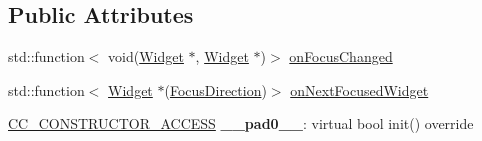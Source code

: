 \subsection*{Public Attributes}
\begin{DoxyCompactItemize}
\item 
std\+::function$<$ void(\hyperlink{classui_1_1Widget}{Widget} $\ast$, \hyperlink{classui_1_1Widget}{Widget} $\ast$)$>$ \hyperlink{classui_1_1Widget_a3e2ceb053bc91747ea2f175cd77e784b}{on\+Focus\+Changed}
\item 
std\+::function$<$ \hyperlink{classui_1_1Widget}{Widget} $\ast$(\hyperlink{classui_1_1Widget_a8ae8e8fc793a04a87584205cd1e8a8a5}{Focus\+Direction})$>$ \hyperlink{classui_1_1Widget_ac298bf6d67ef13843b798acf238ff8aa}{on\+Next\+Focused\+Widget}
\item 
\mbox{\label{classui_1_1Widget_a076ef4aff6f992c3ae8b60033edb014d}} 
\hyperlink{_2cocos2d_2cocos_2base_2ccConfig_8h_a25ef1314f97c35a2ed3d029b0ead6da0}{C\+C\+\_\+\+C\+O\+N\+S\+T\+R\+U\+C\+T\+O\+R\+\_\+\+A\+C\+C\+E\+SS} {\bfseries \+\_\+\+\_\+pad0\+\_\+\+\_\+}\+: virtual bool init() override
\end{DoxyCompactItemize}
